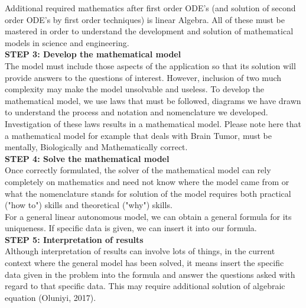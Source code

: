 \documentclass[12pt]{report}
\newcommand{\bt}[1]{\textbf{#1}}
\newcommand{\spn}[1]{\\[#1cm]}
\newcommand{\NI}{\noindent}
\begin{document}
	\NI Additional required mathematics after first order ODE's (and solution of second order ODE's by first order techniques) is linear Algebra. All of these must be mastered in order to understand the development and solution of mathematical models in science and engineering.\\
	
	\NI\bt{STEP 3: Develop the mathematical model}\\
	The model must include those aspects of the application so that its solution will provide answers to the questions of interest. However, inclusion of two much complexity may make the model unsolvable and useless. To develop the mathematical model, we use laws that must be followed, diagrams we have drawn to understand the process and notation and nomenclature we developed. Investigation of these laws results in a mathematical model. Please note here that a mathematical model for example that deals with Brain Tumor, must be mentally, Biologically and Mathematically correct.\spn{0.6}
	
	\NI\bt{STEP 4: Solve the mathematical model}\\
	Once correctly formulated, the solver of the mathematical model can rely completely on mathematics and need not know where the model came from or what the nomenclature stands for solution of the model requires both practical ("how to") skills and theoretical ("why") skills.\spn{0.4}
	For a general linear autonomous model, we can obtain a general formula for its uniqueness. If specific data is given, we can insert it into our formula.\\
	
	\NI\bt{STEP 5: Interpretation of results}\\
	Although interpretation of results can involve lots of things, in the current context where the general model has been solved, it means insert the specific data given in the problem into the formula and answer the questions asked with regard to that specific data. This may require additional solution of algebraic equation (Oluniyi, 2017).\\
	
\end{document}

